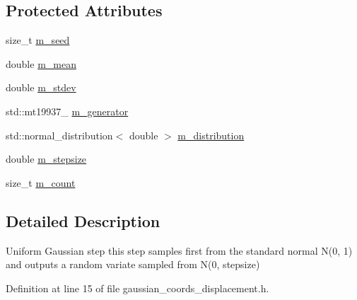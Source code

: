 \subsection*{\-Protected \-Attributes}
\begin{DoxyCompactItemize}
\item 
size\-\_\-t \hyperlink{classmcpele_1_1GaussianCoordsDisplacement_af50ffc7add2d8e7ae70b07c04a620fb7}{m\-\_\-seed}
\item 
double \hyperlink{classmcpele_1_1GaussianCoordsDisplacement_a515b27b041db3301e85bd4da6ba44383}{m\-\_\-mean}
\item 
double \hyperlink{classmcpele_1_1GaussianCoordsDisplacement_a49258ed3098c51b3567e7193ccd57e70}{m\-\_\-stdev}
\item 
std\-::mt19937\-\_ \hyperlink{classmcpele_1_1GaussianCoordsDisplacement_a1e9c3d0a0135be68c503e4148a55f0b6}{m\-\_\-generator}
\item 
std\-::normal\-\_\-distribution$<$ double $>$ \hyperlink{classmcpele_1_1GaussianCoordsDisplacement_a231f5ed3fcf7b644e7bdd44cbd6d318d}{m\-\_\-distribution}
\item 
double \hyperlink{classmcpele_1_1GaussianCoordsDisplacement_a9818016f14a05214f1b50f328612ed79}{m\-\_\-stepsize}
\item 
size\-\_\-t \hyperlink{classmcpele_1_1GaussianCoordsDisplacement_a16890ca6001b9c8ae624fdd89b612aad}{m\-\_\-count}
\end{DoxyCompactItemize}


\subsection{\-Detailed \-Description}
\-Uniform \-Gaussian step this step samples first from the standard normal \-N(0, 1) and outputs a random variate sampled from \-N(0, stepsize) 

\-Definition at line 15 of file gaussian\-\_\-coords\-\_\-displacement.\-h.



